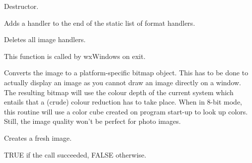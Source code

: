 

Destructor.

\label{wximageaddhandler}


Adds a handler to the end of the static list of format handlers.






Deletes all image handlers.

This function is called by wxWindows on exit.

\label{wximageconverttobitmap}


Converts the image to a platform-specific bitmap object. This has to be done
to actually display an image as you cannot draw an image directly on a window.
The resulting bitmap will use the colour depth of the current system which entails
that a (crude) colour reduction has to take place. When in 8-bit mode, this
routine will use a color cube created on program start-up to look up colors.
Still, the image quality won't be perfect for photo images.

\label{wximagecreate}


Creates a fresh image.





TRUE if the call succeeded, FALSE otherwise.

